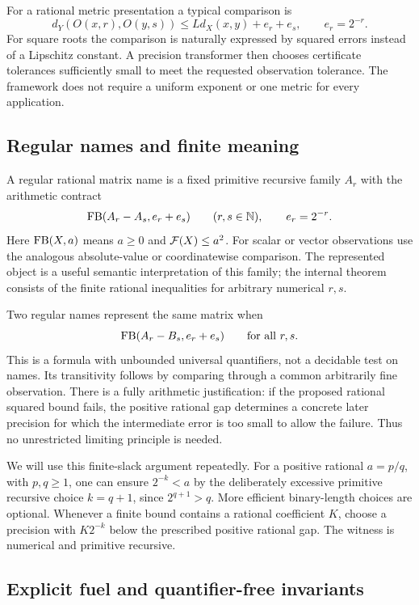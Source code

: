 For a rational metric presentation a typical comparison is
\[
 d_Y(O(x,r),O(y,s))\le Ld_X(x,y)+e_r+e_s,
 \qquad e_r=2^{-r}.
\]
For square roots the comparison is naturally expressed by squared errors instead of a Lipschitz constant. A precision transformer then chooses certificate tolerances sufficiently small to meet the requested observation tolerance. The framework does not require a uniform exponent or one metric for every application.

\subsection{Regular names and finite meaning}

A regular rational matrix name is a fixed primitive recursive family $A_r$ with the arithmetic contract
\[
 \operatorname{FB}(A_r-A_s,e_r+e_s)\qquad(r,s\in\mathbb N),
 \qquad e_r=2^{-r}.
\]
Here $\operatorname{FB}(X,a)$ means $a\ge0$ and $\mathcal F(X)\le a^2$. For scalar or vector observations use the analogous absolute-value or coordinatewise comparison. The represented object is a useful semantic interpretation of this family; the internal theorem consists of the finite rational inequalities for arbitrary numerical $r,s$.

Two regular names represent the same matrix when
\[
 \operatorname{FB}(A_r-B_s,e_r+e_s)\qquad\text{for all }r,s.
\]
This is a formula with unbounded universal quantifiers, not a decidable test on names. Its transitivity follows by comparing through a common arbitrarily fine observation. There is a fully arithmetic justification: if the proposed rational squared bound fails, the positive rational gap determines a concrete later precision for which the intermediate error is too small to allow the failure. Thus no unrestricted limiting principle is needed.

We will use this finite-slack argument repeatedly. For a positive rational $a=p/q$, with $p,q\ge1$, one can ensure $2^{-k}<a$ by the deliberately excessive primitive recursive choice $k=q+1$, since $2^{q+1}>q$. More efficient binary-length choices are optional. Whenever a finite bound contains a rational coefficient $K$, choose a precision with $K2^{-k}$ below the prescribed positive rational gap. The witness is numerical and primitive recursive.

\subsection{Explicit fuel and quantifier-free invariants}

